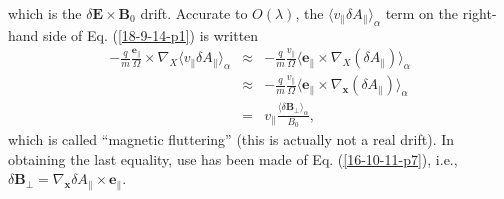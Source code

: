 \documentclass{llncs}
\begin{document}
which is the $\delta \mathbf{E} \times \mathbf{B}_0$ drift. Accurate to $O
(\lambda)$, the $\langle v_{\parallel} \delta A_{\parallel} \rangle_{\alpha}$
term on the right-hand side of Eq. (\ref{18-9-14-p1}) is written
\begin{eqnarray}
  - \frac{q}{m}  \frac{\mathbf{e}_{\parallel}}{\Omega} \times \nabla_X \langle
  v_{\parallel} \delta A_{\parallel} \rangle_{\alpha} & \approx & -
  \frac{q}{m}  \frac{v_{\parallel}}{\Omega} \langle \mathbf{e}_{\parallel}
  \times \nabla_X (\delta A_{\parallel}) \rangle_{\alpha} \nonumber\\
  & \approx & - \frac{q}{m} \frac{v_{\parallel}}{\Omega} \langle
  \mathbf{e}_{\parallel} \times \nabla_{\mathbf{x}} (\delta A_{\parallel})
  \rangle_{\alpha} \\
  & = & v_{\parallel} \frac{\langle \delta \mathbf{B}_{\perp}
  \rangle_{\alpha}}{B_0},  \label{16-10-11-p10}
\end{eqnarray}
which is called ``magnetic fluttering'' (this is actually not a real drift).
In obtaining the last equality, use has been made of Eq. (\ref{16-10-11-p7}),
i.e., $\delta \mathbf{B}_{\perp} = \nabla_{\mathbf{x}} \delta A_{\parallel}
\times \mathbf{e}_{\parallel}$.
\end{document}
